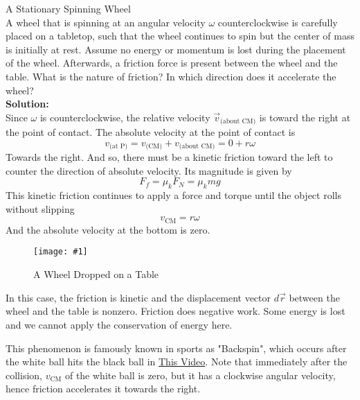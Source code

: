 \documentclass[11pt]{article}
\newcommand{\fig}[4]{
    \begin{figure}[H]
        \centering
        \texttt{[image: \#1]}
        \caption{#2}
        \label{exp4fit}
    \end{figure}
}
\theoremstyle{gangnamstyle}{\newtheorem{definition}{Definition}[]}
\theoremstyle{gangnamstyle}{\newtheorem{example}{Example}[]}
\theoremstyle{gangnamstyle}{\newtheorem{problem}{Problem}[]}
\theoremstyle{gangnamstyle}{\newtheorem{warning}{Warning}[]}
\begin{document}
\begin{example}
A Stationary Spinning Wheel \\
A wheel that is spinning at an angular velocity $\omega$ counterclockwise is carefully placed on a tabletop, such that the wheel continues to spin but the center of mass is initially at rest. Assume no energy or momentum is lost during the placement of the wheel. Afterwards, a friction force is present between the wheel and the table. What is the nature of friction? In which direction does it accelerate the wheel? \\

\textbf{Solution:} \\
Since $\omega$ is counterclockwise, the relative velocity $\Vec{v}_{\text{(about CM)}}$ is toward the right at the point of contact. The absolute velocity at the point of contact is
\[ v_{\text{(at P)}} = v_{\text{(CM)}} + v_{\text{(about CM)}} = 0 + r\omega \]
Towards the right. And so, there must be a kinetic friction toward the left to counter the direction of absolute velocity. Its magnitude is given by
\[ F_f = \mu_kF_N = \mu_kmg \]
This kinetic friction continues to apply a force and torque until the object rolls without slipping
\[ v_{\text{CM}} = r\omega \]
And the absolute velocity at the bottom is zero. 
\fig{figs/n8/drop.jpeg}{A Wheel Dropped on a Table}{0.15}{0}
In this case, the friction is kinetic and the displacement vector $d\Vec{r}$ between the wheel and the table is nonzero. Friction does negative work. Some energy is lost and we cannot apply the conservation of energy here. 

This phenomenon is famously known in sports as "Backspin", which occurs after the white ball hits the black ball in \href{https://youtu.be/auJPuzKigGA?t=58}{This Video}. Note that immediately after the collision, $v_{\text{CM}}$ of the white ball is zero, but it has a clockwise angular velocity, hence friction accelerates it towards the right. 
\end{example}

\pagebreak
\end{document}
